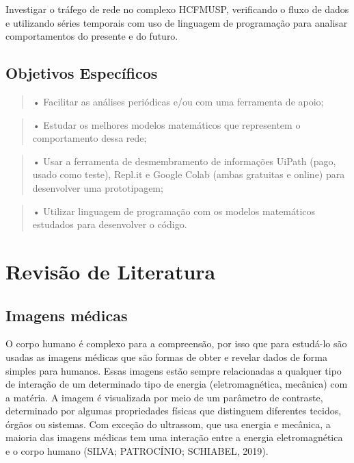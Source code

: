 \documentclass[
	12pt,				%
	openright,			%
	twoside,			%
	a4paper,			%
	english,			%
	french,				%
	spanish,			%
	brazil				%
	]{abntex2}
\begin{document}
Investigar o tráfego de rede no complexo HCFMUSP, verificando o fluxo de dados e utilizando séries temporais com uso de linguagem de programação para analisar comportamentos do presente e do futuro. 

\section{Objetivos Específicos}

\begin{quote}
•	Facilitar as análises periódicas e/ou com uma ferramenta de apoio;
\end{quote}
\begin{quote}
•	Estudar os melhores modelos matemáticos que representem o comportamento dessa rede;
\end{quote}
\begin{quote}
•	Usar a ferramenta de desmembramento de informações UiPath (pago, usado como teste), Repl.it e Google Colab (ambas gratuitas e online) para desenvolver uma prototipagem;
\end{quote}
\begin{quote}
•	Utilizar linguagem de programação com os modelos matemáticos estudados para desenvolver o código.
\end{quote}


%


\chapter{Revisão de Literatura}

\section{Imagens médicas}

O corpo humano é complexo para a compreensão, por isso que para estudá-lo são usadas as imagens médicas que são formas de obter e revelar dados de forma simples para humanos. Essas imagens estão sempre relacionadas a qualquer tipo de interação de um determinado tipo de energia (eletromagnética, mecânica) com a matéria. A imagem é visualizada por meio de um parâmetro de contraste, determinado por algumas propriedades físicas que distinguem diferentes tecidos, órgãos ou sistemas. Com exceção do ultrassom, que usa energia e mecânica, a maioria das imagens médicas tem uma interação entre a energia eletromagnética e o corpo humano (SILVA; PATROCÍNIO; SCHIABEL, 2019).
\end{document}
